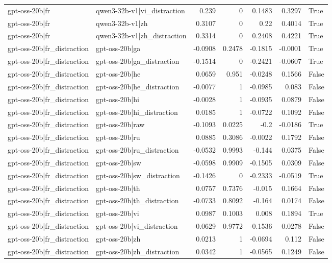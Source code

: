 \begin{table}
\begin{tabular}{l l r r r r l}
gpt-oss-20b|fr & qwen3-32b-v1|vi_distraction & 0.239 & 0 & 0.1483 & 0.3297 & True \\
gpt-oss-20b|fr & qwen3-32b-v1|zh & 0.3107 & 0 & 0.22 & 0.4014 & True \\
gpt-oss-20b|fr & qwen3-32b-v1|zh_distraction & 0.3314 & 0 & 0.2408 & 0.4221 & True \\
gpt-oss-20b|fr_distraction & gpt-oss-20b|ga & -0.0908 & 0.2478 & -0.1815 & -0.0001 & True \\
gpt-oss-20b|fr_distraction & gpt-oss-20b|ga_distraction & -0.1514 & 0 & -0.2421 & -0.0607 & True \\
gpt-oss-20b|fr_distraction & gpt-oss-20b|he & 0.0659 & 0.951 & -0.0248 & 0.1566 & False \\
gpt-oss-20b|fr_distraction & gpt-oss-20b|he_distraction & -0.0077 & 1 & -0.0985 & 0.083 & False \\
gpt-oss-20b|fr_distraction & gpt-oss-20b|hi & -0.0028 & 1 & -0.0935 & 0.0879 & False \\
gpt-oss-20b|fr_distraction & gpt-oss-20b|hi_distraction & 0.0185 & 1 & -0.0722 & 0.1092 & False \\
gpt-oss-20b|fr_distraction & gpt-oss-20b|raw & -0.1093 & 0.0225 & -0.2 & -0.0186 & True \\
gpt-oss-20b|fr_distraction & gpt-oss-20b|ru & 0.0885 & 0.3086 & -0.0022 & 0.1792 & False \\
gpt-oss-20b|fr_distraction & gpt-oss-20b|ru_distraction & -0.0532 & 0.9993 & -0.144 & 0.0375 & False \\
gpt-oss-20b|fr_distraction & gpt-oss-20b|sw & -0.0598 & 0.9909 & -0.1505 & 0.0309 & False \\
gpt-oss-20b|fr_distraction & gpt-oss-20b|sw_distraction & -0.1426 & 0 & -0.2333 & -0.0519 & True \\
gpt-oss-20b|fr_distraction & gpt-oss-20b|th & 0.0757 & 0.7376 & -0.015 & 0.1664 & False \\
gpt-oss-20b|fr_distraction & gpt-oss-20b|th_distraction & -0.0733 & 0.8092 & -0.164 & 0.0174 & False \\
gpt-oss-20b|fr_distraction & gpt-oss-20b|vi & 0.0987 & 0.1003 & 0.008 & 0.1894 & True \\
gpt-oss-20b|fr_distraction & gpt-oss-20b|vi_distraction & -0.0629 & 0.9772 & -0.1536 & 0.0278 & False \\
gpt-oss-20b|fr_distraction & gpt-oss-20b|zh & 0.0213 & 1 & -0.0694 & 0.112 & False \\
gpt-oss-20b|fr_distraction & gpt-oss-20b|zh_distraction & 0.0342 & 1 & -0.0565 & 0.1249 & False \\

\end{tabular}
\end{table}
